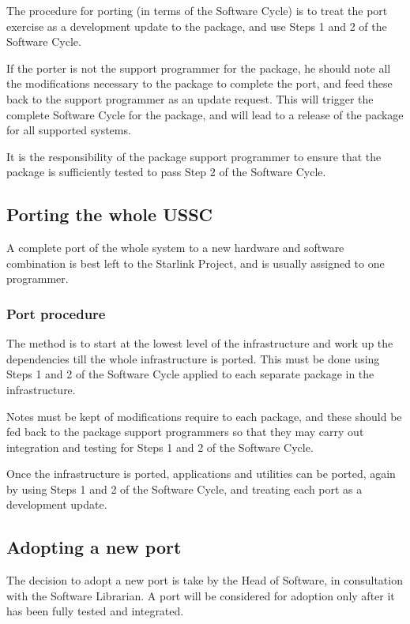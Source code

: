 \documentclass[twoside,11pt]{article}
\newcommand{\xlabel}[1]{}
\begin{document}
The procedure for porting (in terms of the Software Cycle) is to treat
the port exercise as a development update to the package, and use Steps
1 and 2 of the Software Cycle.

If the porter is not the support programmer for the package, he should
note all the modifications necessary to the package to complete the
port, and feed these back to the support programmer as an update
request. This will trigger the complete Software Cycle for the package,
and will lead to a release of the package for all supported systems.

It is the responsibility of the package support programmer to ensure that
the package is sufficiently tested to pass Step 2 of the Software Cycle.

\subsection{\label{porting_the_whole_ussc}\xlabel{porting_the_whole_ussc}Porting the whole USSC}

A complete port of the whole system to a new hardware and software
combination is best left to the Starlink Project, and is usually
assigned to one programmer.

\subsubsection{Port procedure}

The method is to start at the lowest level of the infrastructure and
work up the dependencies till the whole infrastructure is ported.
This must be done using Steps 1 and 2 of the Software Cycle applied
to each separate package in the infrastructure.

Notes must be kept of modifications require to each package, and these
should be fed back to the package support programmers so that they may
carry out integration and testing for Steps 1 and 2 of the Software
Cycle.

Once the infrastructure is ported, applications and utilities can be
ported, again by using Steps 1 and 2 of the Software Cycle, and
treating each port as a development update.

\subsection{\label{adpopting_a_new_port}\xlabel{adpopting_a_new_port}Adopting a new port}

The decision to adopt a new port is take by the Head of Software, in
consultation with the Software Librarian.  A port will be considered
for adoption only after it has been fully tested and integrated.
\end{document}

